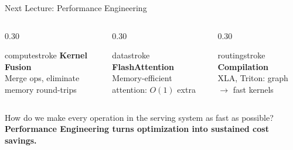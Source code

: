 \documentclass[aspectratio=169, 12pt]{beamer}
\begin{document}
\begin{frame}{Next Lecture: Performance Engineering}

\footnotesize
\begin{columns}[c]
  \begin{column}{0.30\textwidth}
    \centering
    \begin{mlsyscard}{computestroke}
    {\small\bfseries Kernel Fusion}\\[0.05cm]
    {\scriptsize Merge ops, eliminate memory round-trips}
    \end{mlsyscard}
  \end{column}
  \begin{column}{0.30\textwidth}
    \centering
    \begin{mlsyscard}{datastroke}
    {\small\bfseries FlashAttention}\\[0.05cm]
    {\scriptsize Memory-efficient attention: $O(1)$ extra}
    \end{mlsyscard}
  \end{column}
  \begin{column}{0.30\textwidth}
    \centering
    \begin{mlsyscard}{routingstroke}
    {\small\bfseries Compilation}\\[0.05cm]
    {\scriptsize XLA, Triton: graph $\to$ fast kernels}
    \end{mlsyscard}
  \end{column}
\end{columns}

\vspace{0.15cm}
\centering
{\normalsize How do we make every operation in the serving system as fast as possible?}\\[0.05cm]
{\small\textbf{Performance Engineering turns optimization into sustained cost savings.}}

\end{frame}



\appendix
\end{document}
